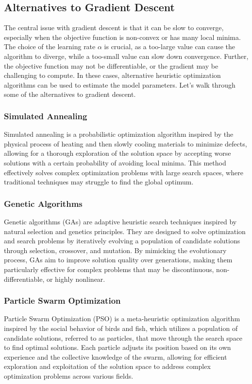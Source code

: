 \documentclass{article}[12pt]
\begin{document}
\subsection{Alternatives to Gradient Descent}
The central issue with gradient descent is that it can be slow to converge, especially when the objective function is non-convex or has many local minima.
The choice of the learning rate $\alpha$ is crucial, as a too-large value can cause the algorithm to diverge, while a too-small value can slow down convergence.
Further, the objective function may not be differentiable, or the gradient may be challenging to compute.
In these cases, alternative heuristic optimization algorithms can be used to estimate the model parameters.
Let's walk through some of the alternatives to gradient descent.

\subsubsection*{Simulated Annealing}
Simulated annealing is a probabilistic optimization algorithm inspired by the physical process of 
heating and then slowly cooling materials to minimize defects, allowing for a thorough exploration of the solution space by accepting worse solutions with a certain probability of avoiding local minima. This method effectively solves complex optimization problems with large search spaces, where traditional techniques may struggle to find the global optimum.

\subsubsection*{Genetic Algorithms}
Genetic algorithms (GAs) are adaptive heuristic search techniques inspired by natural selection and genetics principles. They are designed to solve optimization and search problems by iteratively evolving a population of candidate solutions through selection, crossover, and mutation. By mimicking the evolutionary process, GAs aim to improve solution quality over generations, making them particularly effective for complex problems that may be discontinuous, non-differentiable, or highly nonlinear.

\subsubsection*{Particle Swarm Optimization}
Particle Swarm Optimization (PSO) is a meta-heuristic optimization algorithm inspired by the social behavior of birds and fish, which utilizes a population of candidate solutions, referred to as particles, that move through the search space to find optimal solutions. 
Each particle adjusts its position based on its own experience and the collective knowledge of the swarm, allowing for efficient exploration and exploitation of the solution space to address complex optimization problems across various fields.
\end{document}
